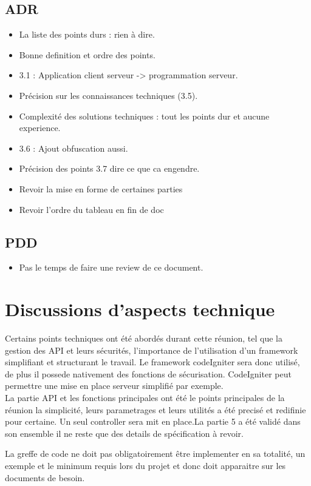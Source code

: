 \documentclass{article}
\begin{document}
\subsection{ADR}

\begin{itemize}
    \item La liste des points durs : rien à dire.
    \item Bonne definition et ordre des points.
    \item 3.1 : Application client serveur -> programmation serveur.
    \item Précision sur les connaissances techniques (3.5).
    \item Complexité des solutions techniques : tout les points dur et aucune experience.
    \item 3.6 : Ajout obfuscation aussi.
    \item Précision des points 3.7 dire ce que ca engendre. 
    \item Revoir la mise en forme de certaines parties
    \item Revoir l'ordre du tableau en fin de doc
\end{itemize}

\subsection{PDD}

\begin{itemize}
    \item Pas le temps de faire une review de ce document.
\end{itemize}

\section{Discussions d'aspects technique}
Certains points techniques ont été abordés durant cette réunion, tel que la gestion des API et leurs sécurités, l'importance de
l'utilisation d'un framework simplifiant et structurant le travail. Le framework codeIgniter sera donc utilisé, de plus il
possede nativement des fonctions de sécurisation.
CodeIgniter peut permettre une mise en place serveur simplifié par exemple.
\\

La partie API et les fonctions principales ont été le points principales de la réunion
la simplicité, leurs parametrages et leurs utilités a été precisé et redifinie pour certaine.
Un seul controller sera mit en place.La partie 5 a été validé dans son ensemble il ne reste que des details de spécification à revoir.\\ \newline

La greffe de code ne doit pas obligatoirement être implementer en sa totalité, un exemple et le minimum requis
lors du projet et donc doit apparaitre sur les documents de besoin.

\newpage
\end{document}
